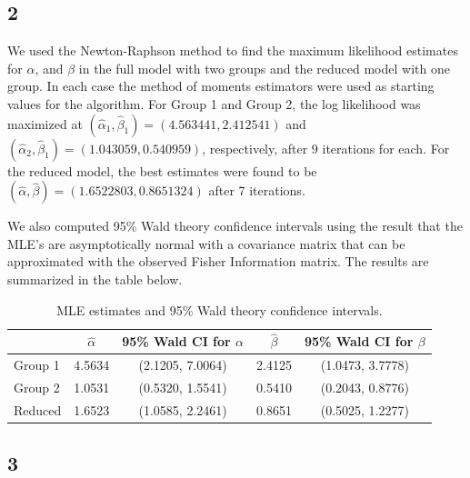 \documentclass[12pt]{article}
\begin{document}
\subsection*{2}

We used the Newton-Raphson method to find the maximum likelihood estimates for $\alpha$, and $\beta$ in the full model with two groups and the reduced
model with one group. 
In each case the method of moments estimators were used as starting values for the algorithm.
For Group 1 and Group 2, the log likelihood was maximized at $(\hat{\alpha}_1, \hat{\beta}_1) = (4.563441, 2.412541)$ and 
$(\hat{\alpha}_2, \hat{\beta}_1) = (1.043059, 0.540959)$, respectively, after 9 iterations for each. For the reduced model, the best estimates were found to be 
$(\hat{\alpha}, \hat{\beta}) = (1.6522803, 0.8651324)$ after 7 iterations. 

We also computed 95\% Wald theory confidence intervals using the result that the MLE's are asymptotically normal with a covariance matrix that can be
approximated with the observed Fisher Information matrix. The results are summarized in the table below.

\begin{table}[h]
  \begin{center}
    \begin{tabular}{|l|c|c|c|c|}
      \hline
      & $\hat{\alpha}$ & 95\% Wald CI for $\alpha$ & $\hat{\beta}$ & 95\% Wald CI for $\beta$ \\
      \hline 
      Group 1 & 4.5634 & (2.1205, 7.0064) & 2.4125 & (1.0473, 3.7778) \\
      \hline
      Group 2 & 1.0531 & (0.5320, 1.5541) & 0.5410 & (0.2043, 0.8776) \\
      \hline
      Reduced & 1.6523 & (1.0585, 2.2461) & 0.8651 & (0.5025, 1.2277) \\
      \hline
    \end{tabular}
  \end{center}
  \caption{MLE estimates and 95\% Wald theory confidence intervals.}
\end{table}



\subsection*{3}
\end{document}
